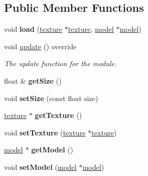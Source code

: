 \subsection*{Public Member Functions}
\begin{DoxyCompactItemize}
\item 
\mbox{\label{classflounder_1_1skyboxes_a5d7c04fdebe5c1ee38fb77c829ec57f2}} 
void {\bfseries load} (\hyperlink{classflounder_1_1texture}{texture} $\ast$\hyperlink{classflounder_1_1texture}{texture}, \hyperlink{classflounder_1_1model}{model} $\ast$\hyperlink{classflounder_1_1model}{model})
\item 
void \hyperlink{classflounder_1_1skyboxes_ae94e675bcda78f2af0298a8551b82aa6}{update} () override
\begin{DoxyCompactList}\small\item\em The update function for the module. \end{DoxyCompactList}\item 
\mbox{\label{classflounder_1_1skyboxes_a644efa62434f725bd5de653bdb2e8494}} 
float \& {\bfseries get\+Size} ()
\item 
\mbox{\label{classflounder_1_1skyboxes_ac3a44d35f512954014dc8d00e0eece36}} 
void {\bfseries set\+Size} (const float size)
\item 
\mbox{\label{classflounder_1_1skyboxes_a520763afde2b4c4003b1ea3cf9e3d680}} 
\hyperlink{classflounder_1_1texture}{texture} $\ast$ {\bfseries get\+Texture} ()
\item 
\mbox{\label{classflounder_1_1skyboxes_a4b2e83807c58240c0d1d05d408bf5838}} 
void {\bfseries set\+Texture} (\hyperlink{classflounder_1_1texture}{texture} $\ast$\hyperlink{classflounder_1_1texture}{texture})
\item 
\mbox{\label{classflounder_1_1skyboxes_a24b61b358a89bb32377c1befc24ae135}} 
\hyperlink{classflounder_1_1model}{model} $\ast$ {\bfseries get\+Model} ()
\item 
\mbox{\label{classflounder_1_1skyboxes_a3dd10313510cb060dc8ccce9d85d3af6}} 
void {\bfseries set\+Model} (\hyperlink{classflounder_1_1model}{model} $\ast$\hyperlink{classflounder_1_1model}{model})

\end{DoxyCompactItemize}
